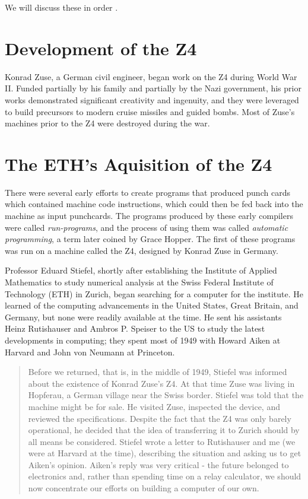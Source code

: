 We will discuss these in order .

\section{Development of the Z4}

Konrad Zuse, a German civil engineer, began work on the Z4 during World War II.
Funded partially by his family and partially by the Nazi government, his prior works
demonstrated significant creativity and ingenuity, and they were leveraged to build
precursors to modern cruise missiles and guided bombs.
Most of Zuse's machines prior to the Z4 were destroyed during the war.


\section{The ETH's Aquisition of the Z4}

There were several early efforts to create programs that produced punch cards
which contained machine code instructions, which could then be fed back into the machine
as input punchcards.
The programs produced by these early compilers were called \textit{run-programs},
and the process of using them was called \textit{automatic programming}, a term later
coined by Grace Hopper.
The first of these programs was run on a machine called the Z4, designed by Konrad Zuse in Germany.

Professor Eduard Stiefel, shortly after establishing the Institute of Applied Mathematics
to study numerical analysis at the Swiss Federal Institute of Technology (ETH) in Zurich,
began searching for a computer for the institute.
He learned of the computing advancements in the United States, Great Britain, and Germany,
but none were readily available at the time.
He sent his assistants Heinz Rutishauser and Ambros P. Speiser to the US to study
the latest developments in computing; they spent most of 1949 with
Howard Aiken at Harvard and John von Neumann at Princeton.

\begin{quotation}
    Before we returned, that is, in the middle of 1949, Stiefel was informed about the existence of Konrad Zuse's
Z4. At that time Zuse was living in Hopferau, a German village near the Swiss border. Stiefel was told that
the machine might be for sale. He visited Zuse, inspected the device, and reviewed the specifications.
Despite the fact that the Z4 was only barely operational, he decided that the idea of transferring it to Zurich
should by all means be considered. Stiefel wrote a letter to Rutishauser and me (we were at Harvard at the
time), describing the situation and asking us to get Aiken's opinion. Aiken's reply was very critical - the
future belonged to electronics and, rather than spending time on a relay calculator, we should now
concentrate our efforts on building a computer of our own.\cite{konrad-zuses-z4-2000}
\end{quotation}

